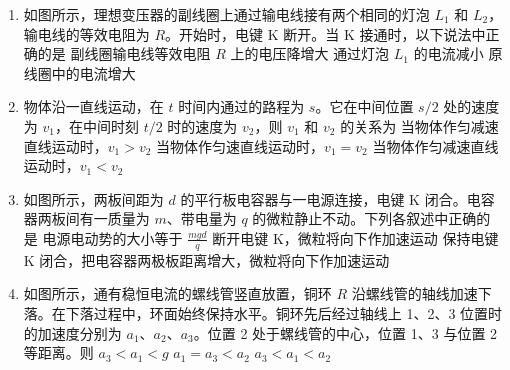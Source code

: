 \documentclass[\gkver]{gaokaozhenti}
\begin{document}
\begin{enumerate}
\item
如图所示，理想变压器的副线圈上通过输电线接有两个相同的灯泡 $L_{1}$ 和 $L_{2}$，输电线的等效电阻为 $R$。开始时，电键 K 断开。当 K 接通时，以下说法中正确的是
\onepicture[w=5.90cm]{}
{副线圈输电线等效电阻 $R$ 上的电压降增大}
{通过灯泡 $L_{1}$ 的电流减小}
{原线圈中的电流增大}

\item
物体沿一直线运动，在 $t$ 时间内通过的路程为 $s$。它在中间位置 $s/2$ 处的速度为 $v_{1}$，在中间时刻 $t/2$ 时的速度为 $v_{2}$，则 $v_{1}$ 和 $v_{2}$ 的关系为
{当物体作匀减速直线运动时，$v_{1} > v_{2}$}
{当物体作匀速直线运动时，$v_{1} = v_{2}$}
{当物体作匀减速直线运动时，$v_{1} < v_{2}$}

\item
如图所示，两板间距为 $d$ 的平行板电容器与一电源连接，电键 K 闭合。电容器两板间有一质量为 $m$、带电量为 $q$ 的微粒静止不动。下列各叙述中正确的是
\onepicture[w=4.66cm]{}
{电源电动势的大小等于 $\frac{mgd}{q}$}
{断开电键 K，微粒将向下作加速运动}
{保持电键 K 闭合，把电容器两极板距离增大，微粒将向下作加速运动}

\item
如图所示，通有稳恒电流的螺线管竖直放置，铜环 $R$ 沿螺线管的轴线加速下落。在下落过程中，环面始终保持水平。铜环先后经过轴线上 1、2、3 位置时的加速度分别为 $a_{1}$、$a_{2}$、$a_{3}$。位置 2 处于螺线管的中心，位置 1、3 与位置 2 等距离。则
\onepicture[h=4.73cm]{}
{$a_{3} < a_{1} < g$}
{$a_{1} = a_{3} < a_{2}$}
{$a_{3} < a_{1} < a_{2}$}


\end{enumerate}
\end{document}
